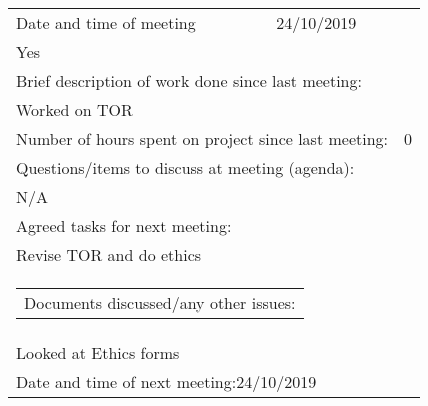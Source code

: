 \begin{tabularx}{\textwidth}{|X|X|X|}
     
\hline
Date and time of meeting                         &          24/10/2019               & \begin{tabular}[c]{@{}l@{}}As scheduled:  \\ Yes\end{tabular} \\ \hline
\multicolumn{3}{|l|}{Brief description of work done since last meeting:}                                                                      \\ \hline
\multicolumn{3}{|l|}{Worked on TOR}                                                                                                                     \\ \hline
\multicolumn{2}{|l|}{Number of hours spent on project since last meeting:} & 0               \\ \hline
\multicolumn{3}{|l|}{Questions/items to discuss at meeting (agenda):}         \\ \hline

\multicolumn{3}{|l|}{N/A}     \\ \hline
\multicolumn{3}{|l|}{Agreed tasks for next meeting: }     \\ \hline
\multicolumn{3}{|l|}{Revise TOR and  do ethics}                                                                                                                     \\ \hline
\multicolumn{3}{|l|}{\begin{tabular}[c]{@{}l@{}}Documents discussed/any other issues:\end{tabular}}                                        \\ \hline
\multicolumn{3}{|l|}{Looked at Ethics forms}                                             
\\ \hline
\multicolumn{3}{|l|}{Date and time of next meeting:24/10/2019}                       \\ \hline
\end{tabularx}


